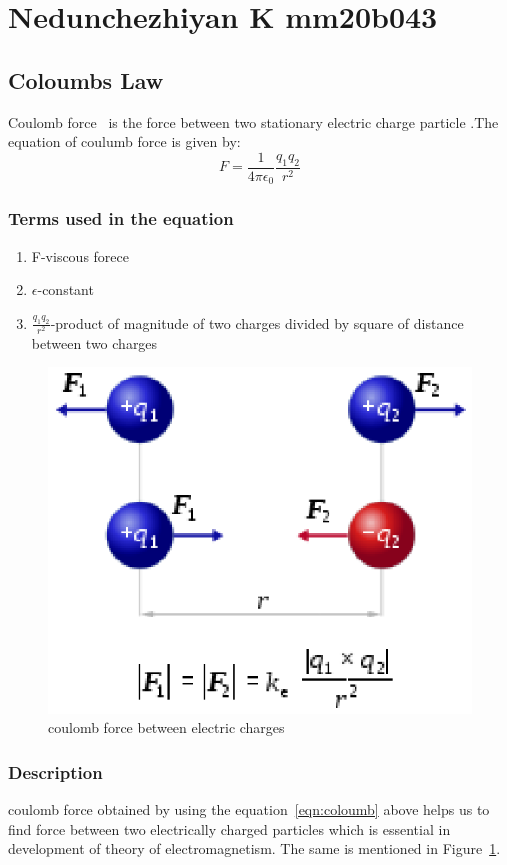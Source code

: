 \section{Nedunchezhiyan K mm20b043}
\subsection{Coloumbs Law}
Coulomb force~\cite{bibfile} is the force between two stationary electric charge particle
.The equation of coulumb force is given by:
\begin{equation}
F=\frac{1}{4\pi \epsilon_0}\frac{q_1 q_2}{r^2}
\label{eqn:coloumb}
\end{equation}
\subsubsection{Terms used in the equation}
\begin{enumerate}
 \item F-viscous forece
 \item$\epsilon$-constant
 \item$\frac{q_1 q_2}{r^2}$-product of magnitude of two charges divided by square of distance between two charges
\end{enumerate}
\begin{figure}[h]
 \begin{center}
    \includegraphics[scale=0.6]{mm20b043.eps}
 \end{center}
\caption{coulomb force between electric charges}
\label{fig:coloumb}
\end{figure}
\subsubsection{Description}
coulomb force obtained by using the equation~\ref{eqn:coloumb} above helps us to find force between two electrically charged particles which is essential in development of theory of electromagnetism. The same is mentioned in Figure~\ref{fig:coloumb}.
